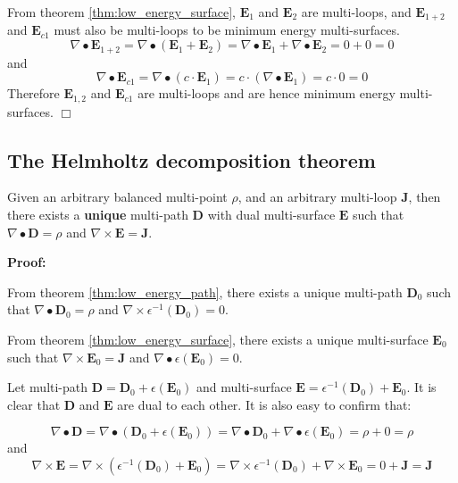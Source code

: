 From theorem \ref{thm:low_energy_surface}, \(\mathbf{E}_1\) and \(\mathbf{E}_2\) are multi-loops, and \(\mathbf{E}_{1+2}\) and \(\mathbf{E}_{c1}\) must also be multi-loops to be minimum energy multi-surfaces. 
\[\nabla \bullet \mathbf{E}_{1+2} = \nabla \bullet (\mathbf{E}_1 + \mathbf{E}_2) = \nabla \bullet \mathbf{E}_1 + \nabla \bullet \mathbf{E}_2 = 0 + 0 = 0\]
and
\[\nabla \bullet \mathbf{E}_{c1} = \nabla \bullet (c \cdot \mathbf{E}_1) = c \cdot (\nabla \bullet \mathbf{E}_1) = c \cdot 0 = 0\]
Therefore \(\mathbf{E}_{1,2}\) and \(\mathbf{E}_{c1}\) are multi-loops and are hence minimum energy multi-surfaces. \(\Box\)



\subsection{The Helmholtz decomposition theorem}

\begin{thm}\label{thm:exactly_one_solution}   
Given an arbitrary balanced multi-point \(\rho\), and an arbitrary multi-loop \(\mathbf{J}\), then there exists a {\bf unique} multi-path \(\mathbf{D}\) with dual multi-surface \(\mathbf{E}\) such that \(\nabla \bullet \mathbf{D} = \rho\) and \(\nabla \times \mathbf{E} = \mathbf{J}\).
\end{thm}
\textbf{Proof:}

From theorem \ref{thm:low_energy_path}, there exists a unique multi-path \(\mathbf{D}_0\) such that \(\nabla \bullet \mathbf{D}_0 = \rho\) and \(\nabla \times \epsilon^{-1}(\mathbf{D}_0) = 0\). 

From theorem \ref{thm:low_energy_surface}, there exists a unique multi-surface \(\mathbf{E}_0\) such that \(\nabla \times \mathbf{E}_0 = \mathbf{J}\) and \(\nabla \bullet \epsilon(\mathbf{E}_0) = 0\). 

Let multi-path \(\mathbf{D} = \mathbf{D}_0 + \epsilon(\mathbf{E}_0)\) and multi-surface \(\mathbf{E} = \epsilon^{-1}(\mathbf{D}_0) + \mathbf{E}_0\). It is clear that \(\mathbf{D}\) and \(\mathbf{E}\) are dual to each other. It is also easy to confirm that:

\[\nabla \bullet \mathbf{D} = \nabla \bullet (\mathbf{D}_0 + \epsilon(\mathbf{E}_0)) = \nabla \bullet \mathbf{D}_0 + \nabla \bullet \epsilon(\mathbf{E}_0) = \rho + 0 = \rho\]      
and 
\[\nabla \times \mathbf{E} = \nabla \times (\epsilon^{-1}(\mathbf{D}_0) + \mathbf{E}_0) = \nabla \times \epsilon^{-1}(\mathbf{D}_0) + \nabla \times \mathbf{E}_0 = 0 + \mathbf{J} = \mathbf{J}\]

